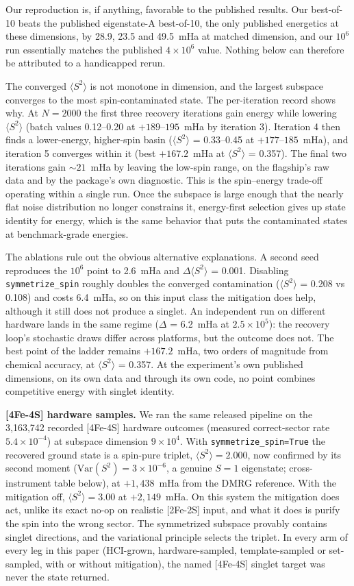 \documentclass[11pt]{article}
\newcommand{\ssq}{\ensuremath{\langle S^2\rangle}}
\begin{document}
Our reproduction is, if anything, favorable to the published results. Our best-of-10 beats the published eigenstate-A best-of-10, the only published energetics at these dimensions, by 28.9, 23.5 and 49.5~mHa at matched dimension, and our $10^6$ run essentially matches the published $4\times10^6$ value. Nothing below can therefore be attributed to a handicapped rerun.

The converged \ssq{} is not monotone in dimension, and the largest subspace converges to the most spin-contaminated state. The per-iteration record shows why. At $N=2000$ the first three recovery iterations gain energy while lowering \ssq{} (batch values 0.12--0.20 at $+189$--$195$~mHa by iteration 3). Iteration 4 then finds a lower-energy, higher-spin basin (\ssq{} = 0.33--0.45 at $+177$--$185$~mHa), and iteration 5 converges within it (best $+167.2$~mHa at \ssq{} = 0.357). The final two iterations gain ${\sim}21$~mHa by leaving the low-spin range, on the flagship's raw data and by the package's own diagnostic. This is the spin--energy trade-off operating within a single run. Once the subspace is large enough that the nearly flat noise distribution no longer constrains it, energy-first selection gives up state identity for energy, which is the same behavior that puts the contaminated states at benchmark-grade energies.

The ablations rule out the obvious alternative explanations. A second seed reproduces the $10^6$ point to 2.6~mHa and $\Delta$\ssq{} = 0.001. Disabling \texttt{symmetrize\_spin} roughly doubles the converged contamination (\ssq{} = 0.208 vs 0.108) and costs 6.4~mHa, so on this input class the mitigation does help, although it still does not produce a singlet. An independent run on different hardware lands in the same regime ($\Delta$ = 6.2~mHa at $2.5\times10^5$): the recovery loop's stochastic draws differ across platforms, but the outcome does not. The best point of the ladder remains $+167.2$~mHa, two orders of magnitude from chemical accuracy, at \ssq{} = 0.357. At the experiment's own published dimensions, on its own data and through its own code, no point combines competitive energy with singlet identity.

\textbf{[4Fe-4S] hardware samples.} We ran the same released pipeline on the 3{,}163{,}742 recorded [4Fe-4S] hardware outcomes (measured correct-sector rate $5.4\times10^{-4}$) at subspace dimension $9\times10^4$. With \texttt{symmetrize\_spin=True} the recovered ground state is a spin-pure triplet, $\ssq = 2.000$, now confirmed by its second moment ($\mathrm{Var}(S^2) = 3\times10^{-6}$, a genuine $S = 1$ eigenstate; cross-instrument table below), at $+1{,}438$~mHa from the DMRG reference. With the mitigation off, $\ssq = 3.00$ at $+2{,}149$~mHa. On this system the mitigation does act, unlike its exact no-op on realistic [2Fe-2S] input, and what it does is purify the spin into the wrong sector. The symmetrized subspace provably contains singlet directions, and the variational principle selects the triplet. In every arm of every leg in this paper (HCI-grown, hardware-sampled, template-sampled or set-sampled, with or without mitigation), the named [4Fe-4S] singlet target was never the state returned.
\end{document}

